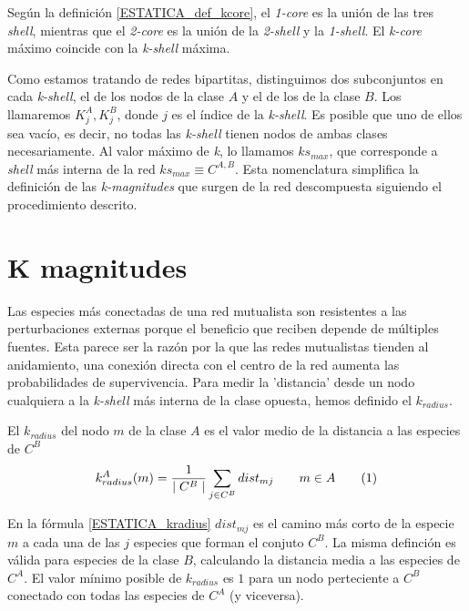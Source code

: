 Según la definición \ref{ESTATICA_def_kcore}, el  \textit{1-core} es la unión de las tres \textit{shell}, mientras que el \textit{2-core} es la unión de la \textit{2-shell} y la \textit{1-shell}. El \textit{k-core} máximo coincide con la  \textit{k-shell} máxima. 

Como estamos tratando de redes bipartitas, distinguimos dos subconjuntos en cada \textit{k-shell}, el de los nodos de la clase $A$ y el de los de la clase $B$. Los llamaremos $K^{A}_{j}, K^{B}_{j}$, donde  $j$ es el índice de la \textit{k-shell}.
Es posible que uno de ellos sea vacío, es decir, no todas las \textit{k-shell} tienen nodos de ambas clases necesariamente.
Al valor máximo de \textit{k}, lo llamamos $ks_{max}$, que corresponde a \textit{shell} más interna de la red $ks_{max}\equiv C^{A,B}$. Esta nomenclatura simplifica la definición de las \textit{k-magnitudes} que surgen de la red descompuesta siguiendo el procedimiento descrito.


\section{K magnitudes}

Las especies más conectadas de una red mutualista son resistentes a las perturbaciones externas porque el beneficio que reciben depende de múltiples fuentes. Esta parece ser la razón por la que las redes mutualistas tienden al anidamiento, una conexión directa con el centro de la red aumenta las probabilidades de supervivencia. Para medir la 'distancia' desde un nodo cualquiera a la \textit{k-shell} más interna de la clase opuesta, hemos definido el \textit{$k_{radius}$}.

\begin{theo} 
El \textit{$k_{radius}$} del nodo $m$ de la clase $A$ es el valor medio de la distancia a las especies de $C^B$
\begin{align*}
\displaystyle
k^A_{radius}(m) = \frac{1}{\mid C^{B} \mid}\sum\limits_{j \in C^{B}} dist_{mj}  \qquad   m \in A
\stepcounter{equation}\tag{\theequation}\label{kradius}
\end{align*}
\label{ESTATICA_kradius}
\end{theo}

En la fórmula \ref{ESTATICA_kradius} $dist_{mj}$ es el camino más corto de la especie $m$ a cada una de las $j$ especies que forman el conjuto $C^B$. La misma definción es válida para especies de la clase $B$, calculando la distancia media a las especies de $C^A$. El valor mínimo posible de $k_{radius}$ es $1$ para un nodo perteciente a $C^B$ conectado con todas las especies de $C^A$ (y viceversa).

